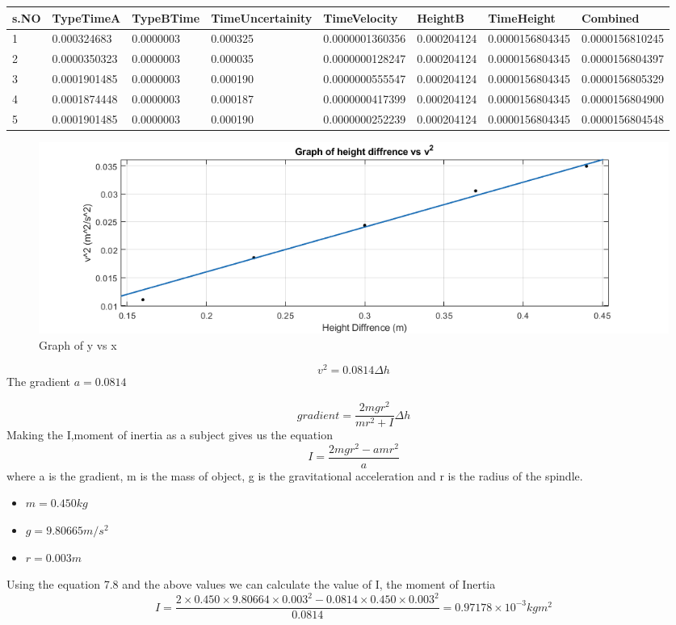 \begin{center}
\begin{adjustbox}{width=1\textwidth}
\begin{tabular}{|l|l|l|l|l|l|l|l|}
\hline
s.NO & TypeTimeA    & TypeBTime & TimeUncertainity & TimeVelocity    & HeightB     & TimeHeight      & Combined        \\ \hline
1    & 0.000324683  & 0.0000003 & 0.000325         & 0.0000001360356 & 0.000204124 & 0.0000156804345 & 0.0000156810245 \\ \hline
2    & 0.0000350323 & 0.0000003 & 0.000035         & 0.0000000128247 & 0.000204124 & 0.0000156804345 & 0.0000156804397 \\ \hline
3    & 0.0001901485 & 0.0000003 & 0.000190         & 0.0000000555547 & 0.000204124 & 0.0000156804345 & 0.0000156805329 \\ \hline
4    & 0.0001874448 & 0.0000003 & 0.000187         & 0.0000000417399 & 0.000204124 & 0.0000156804345 & 0.0000156804900 \\ \hline
5    & 0.0001901485 & 0.0000003 & 0.000190         & 0.0000000252239 & 0.000204124 & 0.0000156804345 & 0.0000156804548 \\ \hline
\end{tabular}
\end{adjustbox}
\end{center}

\begin{figure}[h!]
    \centering
    \includegraphics[width=\textwidth]{figures/AvgH_v2.png}
    \caption{Graph of y vs x}
    \label{fig:yx}
\end{figure}
\begin{equation}
    v^2 = 0.0814 \Delta h
\end{equation}
The gradient $ a = 0.0814 $

\begin{equation}
    gradient = \frac{2mgr^2}{mr^2 + I}  \Delta h
\end{equation}
Making the I,moment of inertia as a subject gives us the equation
\begin{equation}
    I  = \frac{2mgr^2 -amr^2}{a}
\end{equation}
where a is the gradient, m is the mass of object, g is the gravitational acceleration and r is the radius of the spindle. 
\begin{itemize}
    \item $ m = 0.450 kg $
    \item $ g = 9.80665 m/s^2 $
    \item $ r = 0.003 m$
\end{itemize}
Using the equation 7.8 and the above values we can calculate the value of I, the moment of Inertia 
$$ I  = \frac{2 \times 0.450 \times 9.80664 \times 0.003^2 -0.0814 \times 0.450 \times 0.003^2}{0.0814} = 0.97178 \times 10^{-3} kg m^2$$

